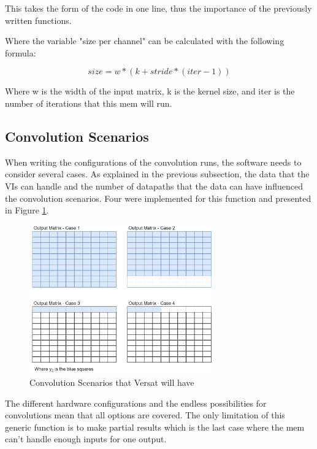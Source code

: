 This takes the form of the code in one line, thus the importance of the previously written functions.



Where the variable "size per channel" can be calculated with the following formula:

\[ size=w*(k+stride*(iter-1)) \]

Where w is the width of the input matrix, k is the kernel size, and iter is the number of iterations that this mem will run.

\subsection{Convolution Scenarios}
\label{ConvolutionScenarios}

When writing the configurations of the convolution runs, the software needs to consider several cases.
As explained in the previous subsection, the data that the VIs can handle and the number of datapaths that the data can have influenced
the convolution scenarios. Four were implemented for this function and presented in Figure \ref{ConvScenarioss}.

\begin{figure}[!htbp]
    \centering
    \includegraphics[width=0.7\textwidth]{Figures/Variables.drawio.png}
    \caption{Convolution Scenarios that Versat will have}
    \label{ConvScenarioss}
\end{figure}

The different hardware configurations and the endless possibilities for convolutions mean that all options are covered. 
The only limitation of this generic function is to make partial results which is the last case where the mem can't handle enough inputs for one output.

